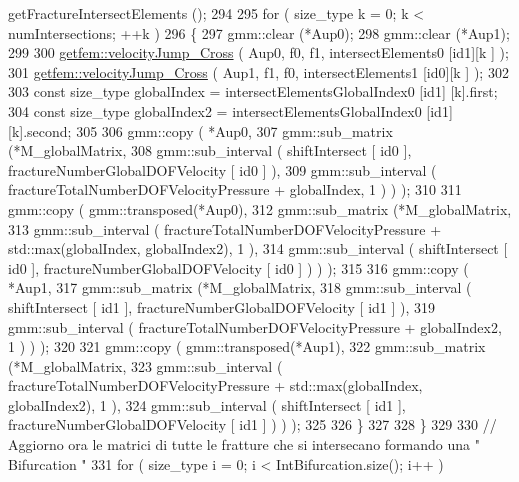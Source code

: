 \begin{DoxyCode}
      getFractureIntersectElements ();
294         
295         \textcolor{keywordflow}{for} ( size\_type k = 0; k < numIntersections; ++k )
296         \{
297             gmm::clear (*Aup0);
298             gmm::clear (*Aup1);
299 
300             \hyperlink{namespacegetfem_acc74b86734c3814042e614d015f23876}{getfem::velocityJump\_Cross} ( Aup0, f0, f1, intersectElements0 [id1][k
      ] );
301             \hyperlink{namespacegetfem_acc74b86734c3814042e614d015f23876}{getfem::velocityJump\_Cross} ( Aup1, f1, f0, intersectElements1 [id0][k
      ] );
302 
303             \textcolor{keyword}{const} size\_type globalIndex = intersectElementsGlobalIndex0 [id1] [k].first;
304             \textcolor{keyword}{const} size\_type globalIndex2 = intersectElementsGlobalIndex0 [id1] [k].second;
305             
306             gmm::copy ( *Aup0, 
307                         gmm::sub\_matrix (*M\_globalMatrix,
308                                         gmm::sub\_interval ( shiftIntersect [ id0 ], 
      fractureNumberGlobalDOFVelocity [ id0 ] ),
309                                         gmm::sub\_interval (  fractureTotalNumberDOFVelocityPressure + 
      globalIndex, 1 ) ) );
310 
311             gmm::copy ( gmm::transposed(*Aup0), 
312                         gmm::sub\_matrix (*M\_globalMatrix,
313                                         gmm::sub\_interval (  fractureTotalNumberDOFVelocityPressure + 
      std::max(globalIndex, globalIndex2), 1 ),
314                                         gmm::sub\_interval ( shiftIntersect [ id0 ], 
      fractureNumberGlobalDOFVelocity [ id0 ] ) ) );
315 
316             gmm::copy ( *Aup1, 
317                         gmm::sub\_matrix (*M\_globalMatrix,
318                                         gmm::sub\_interval ( shiftIntersect [ id1 ], 
      fractureNumberGlobalDOFVelocity [ id1 ] ),
319                                         gmm::sub\_interval (  fractureTotalNumberDOFVelocityPressure + 
      globalIndex2, 1 ) ) );
320 
321             gmm::copy ( gmm::transposed(*Aup1), 
322                         gmm::sub\_matrix (*M\_globalMatrix,
323                                         gmm::sub\_interval (  fractureTotalNumberDOFVelocityPressure + 
      std::max(globalIndex, globalIndex2), 1 ),
324                                         gmm::sub\_interval ( shiftIntersect [ id1 ], 
      fractureNumberGlobalDOFVelocity [ id1 ] ) ) );
325 
326          \}
327         
328     \}
329     
330     \textcolor{comment}{// Aggiorno ora le matrici di tutte le fratture che si intersecano formando una " Bifurcation "}
331     \textcolor{keywordflow}{for} ( size\_type i = 0; i < IntBifurcation.size(); i++ )

\end{DoxyCode}
